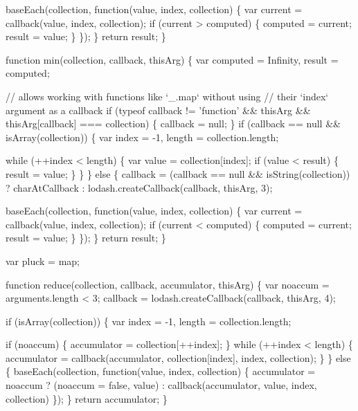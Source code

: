 \begin{DoxyCodeInclude}
        baseEach(collection, \textcolor{keyword}{function}(value, index, collection) \{
          var current = callback(value, index, collection);
          \textcolor{keywordflow}{if} (current > computed) \{
            computed = current;
            result = value;
          \}
        \});
      \}
      \textcolor{keywordflow}{return} result;
    \}

    \textcolor{keyword}{function} min(collection, callback, thisArg) \{
      var computed = Infinity,
          result = computed;

      \textcolor{comment}{// allows working with functions like `\_.map` without using}
      \textcolor{comment}{// their `index` argument as a callback}
      \textcolor{keywordflow}{if} (typeof callback != \textcolor{stringliteral}{'function'} && thisArg && thisArg[callback] === collection) \{
        callback = null;
      \}
      \textcolor{keywordflow}{if} (callback == null && isArray(collection)) \{
        var index = -1,
            length = collection.length;

        \textcolor{keywordflow}{while} (++index < length) \{
          var value = collection[index];
          \textcolor{keywordflow}{if} (value < result) \{
            result = value;
          \}
        \}
      \} \textcolor{keywordflow}{else} \{
        callback = (callback == null && isString(collection))
          ? charAtCallback
          : lodash.createCallback(callback, thisArg, 3);

        baseEach(collection, \textcolor{keyword}{function}(value, index, collection) \{
          var current = callback(value, index, collection);
          \textcolor{keywordflow}{if} (current < computed) \{
            computed = current;
            result = value;
          \}
        \});
      \}
      \textcolor{keywordflow}{return} result;
    \}

    var pluck = map;

    \textcolor{keyword}{function} reduce(collection, callback, accumulator, thisArg) \{
      var noaccum = arguments.length < 3;
      callback = lodash.createCallback(callback, thisArg, 4);

      \textcolor{keywordflow}{if} (isArray(collection)) \{
        var index = -1,
            length = collection.length;

        \textcolor{keywordflow}{if} (noaccum) \{
          accumulator = collection[++index];
        \}
        \textcolor{keywordflow}{while} (++index < length) \{
          accumulator = callback(accumulator, collection[index], index, collection);
        \}
      \} \textcolor{keywordflow}{else} \{
        baseEach(collection, \textcolor{keyword}{function}(value, index, collection) \{
          accumulator = noaccum
            ? (noaccum = \textcolor{keyword}{false}, value)
            : callback(accumulator, value, index, collection)
        \});
      \}
      \textcolor{keywordflow}{return} accumulator;
    \}


\end{DoxyCodeInclude}
